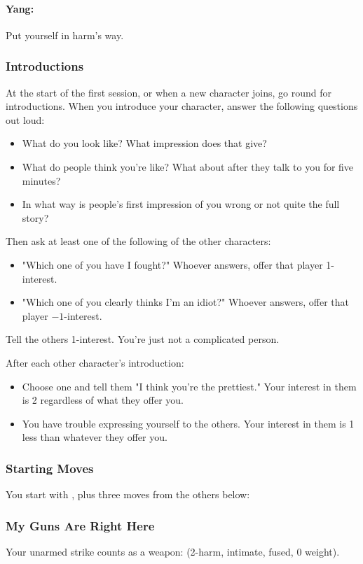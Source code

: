 \paragraph{Yang:} Put yourself in harm's way.

\subsubsection{Introductions}
At the start of the first session, or when a new character joins, go round for introductions.
When you introduce your character, answer the following questions out loud:
\begin{itemize}
\item What do you look like? What impression does that give?
\item What do people think you're like? What about after they talk to you for five minutes?
\item In what way is people's first impression of you wrong or not quite the full story?
\end{itemize}

Then ask at least one of the following of the other characters:
\begin{itemize}
\item "Which one of you have I fought?" Whoever answers, offer that player 1-interest.
\item "Which one of you clearly thinks I'm an idiot?" Whoever answers, offer that player $-1$-interest.
\end{itemize}
Tell the others 1-interest. You're just not a complicated person.

After each other character's introduction:
\begin{itemize}
\item Choose one and tell them "I think you're the prettiest." Your interest in them is 2 regardless of what they offer you.
\item You have trouble expressing yourself to the others. Your interest in them is 1 less than whatever they offer you.
\end{itemize}

\subsubsection{Starting Moves}
You start with , plus three moves from the others below:

\subsubsection{My Guns Are Right Here}\label{sec:My Guns Are Right Here}
Your unarmed strike counts as a weapon: (2-harm, intimate, fused, 0 weight).

